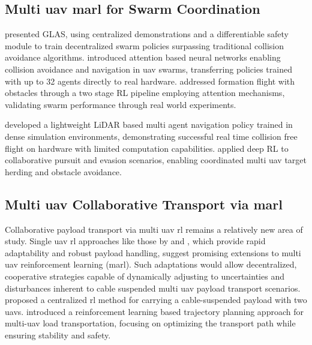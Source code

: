 \subsection{Multi \gls{uav} \gls{marl} for Swarm Coordination}
\cite{riviere_glas_2020} presented GLAS, using centralized demonstrations and a differentiable safety module to train decentralized swarm policies surpassing traditional collision avoidance algorithms. \cite{huang_collision_2024} introduced attention based neural networks enabling collision avoidance and navigation in \gls{uav} swarms, transferring policies trained with up to 32 agents directly to real hardware. \cite{xie_multi-uav_2024} addressed formation flight with obstacles through a two stage RL pipeline employing attention mechanisms, validating swarm performance through real world experiments.

\cite{diao_efficient_2024} developed a lightweight LiDAR based multi agent navigation policy trained in dense simulation environments, demonstrating successful real time collision free flight on hardware with limited computation capabilities. \cite{zhao_deep_2024} applied deep RL to collaborative pursuit and evasion scenarios, enabling coordinated multi \gls{uav} target herding and obstacle avoidance.

\subsection{Multi \gls{uav} Collaborative Transport via \gls{marl}}
Collaborative payload transport via multi \gls{uav} \gls{rl} remains a relatively new area of study. Single \gls{uav} \gls{rl} approaches like those by \cite{belkhale_model-based_2021} and \cite{hua_new_2022}, which provide rapid adaptability and robust payload handling, suggest promising extensions to multi \gls{uav} reinforcement learning (\gls{marl}). Such adaptations would allow decentralized, cooperative strategies capable of dynamically adjusting to uncertainties and disturbances inherent to cable suspended multi \gls{uav} payload transport scenarios. \cite{Lin2024PayloadTW} proposed a centralized \gls{rl} method for carrying a cable-suspended payload with two \glspl{uav}. \cite{Estevez2024Reinforcement} introduced a reinforcement learning based trajectory planning approach for multi-\gls{uav} load transportation, focusing on optimizing the transport path while ensuring stability and safety.